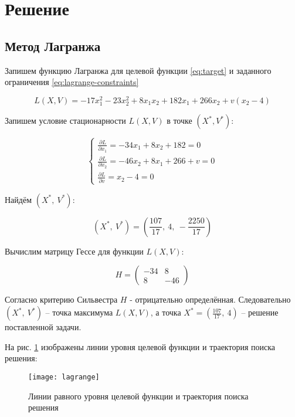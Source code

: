 \section{Решение}

\subsection{Метод Лагранжа}

Запишем функцию Лагранжа для целевой функции \ref{eq:target} и заданного ограничения \ref{eq:lagrange-constraints}

\begin{equation*}
	L(X, V) = -17 x^2_1 - 23 x^2_2 + 8 x_1 x_2 + 182 x_1 + 266 x_2 + v(x_2 - 4)
\end{equation*}

Запишем условие стационарности $L(X, V)$ в точке $(X^*, V^*)$:

\begin{equation*}
	\begin{cases}
		\frac{\partial L}{\partial x_1} = -34 x_1 + 8 x_2 + 182 = 0
		\\
		\frac{\partial L}{\partial x_2} = -46 x_2 + 8 x_1 + 266 + v = 0
		\\
		\frac{\partial L}{\partial v} = x_2 - 4 = 0
	\end{cases}
\end{equation*}

Найдём $(X^*,\ V^*)$:

\begin{equation*}
	(X^*,\ V^*) = \left( \frac{107}{17},\ 4,\ -\frac{2250}{17} \right)
\end{equation*}

Вычислим матрицу Гессе для функции $L(X, V)$:

\begin{equation*}
	H = \begin{pmatrix}
		-34 & 8
		\\
		8 & -46
	\end{pmatrix}
\end{equation*}

Согласно критерию Сильвестра $H$ - отрицательно определённая. Следовательно $(X^*,\ V^*)$ -- точка максимума $L(X, V)$, а точка $X^* = \left(\frac{107}{17},\ 4 \right)$ -- решение поставленной задачи.

На рис. \ref{pic:lagrange} изображены линии уровня целевой функции и траектория поиска решения:

\begin{figure}[H]
\begin{center}
	\texttt{[image: lagrange]}
	\caption{Линии равного уровня целевой функции и траектория поиска решения}
	\label{pic:lagrange}
\end{center}
\end{figure}

